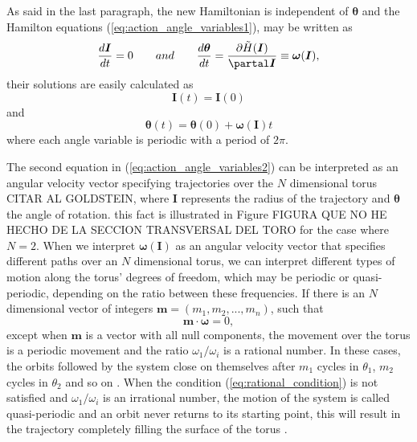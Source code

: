 As said in the last paragraph, the new Hamiltonian is independent of $\bm{\theta}$ and the Hamilton equations (\ref{eq:action_angle_variables1}), may be written as 
\begin{equation}
\frac{d\bm{I}}{dt}=0 \qquad and \qquad \frac{d\bm{\theta}}{dt}=\frac{\partial \tilde{H}(\bm{I})}{\partal \bm{I}}\equiv \bm{\omega}(\bm{I}),
\label{eq:action_angle_variables2}
\end{equation}
their solutions are easily calculated as
\begin{equation}
\bm{I}(t)=\bm{I}(0)
\end{equation}
and
\begin{equation}
\bm{\theta}(t)=\bm{\theta}(0)+\bm{\omega}(\bm{I})t
\end{equation}
where each angle variable is periodic with a period of $2\pi$.\par

The second equation in  (\ref{eq:action_angle_variables2}) can be interpreted as an angular velocity vector specifying trajectories over the $N$ dimensional torus CITAR AL GOLDSTEIN, where $\bm{I}$ represents the radius of the trajectory and $\bm{\theta}$ the angle of rotation. this fact is illustrated in Figure FIGURA QUE NO HE HECHO DE LA SECCION TRANSVERSAL DEL TORO for the case where $N=2$. When we interpret $\bm{\omega}(\bm{I})$ as an angular velocity vector that specifies different paths over an $N$ dimensional torus, we can interpret different types of motion along the torus' degrees of freedom, which may be periodic or quasi-periodic, depending on the ratio between these frequencies. If there is an $N$ dimensional vector of integers $\bm{m}=(m_1,m_2,...,m_n)$, such that
\begin{equation}
\bm{m}\cdot \bm{\omega}=0,
\label{eq:rational_condition}
\end{equation}
except when $\bm{m}$ is a vector with all null components, the movement over the torus is a periodic movement and the ratio $\omega_1/\omega_i$ is a rational number. In these cases, the orbits followed by the system close on themselves after $m_1$ cycles in $\theta_1$, $m_2$ cycles in $\theta_2$ and so on \cite{ottChaosDynamicalSystems2002}. When the condition (\ref{eq:rational_condition}) is not satisfied and $\omega_1/\omega_i$ is an irrational number, the motion of the system is called quasi-periodic and an orbit never returns to its starting point, this will result in the trajectory completely filling the surface of the torus \cite{ottChaosDynamicalSystems2002}.\par


